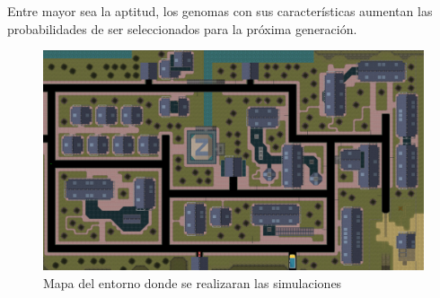 \documentclass[conference]{IEEEtran}
\begin{document}
Entre mayor sea la aptitud, los genomas con sus características aumentan las probabilidades de ser seleccionados para la próxima generación.

\begin{figure}[H]
    \centering
    \includegraphics[scale=0.14]{images/gta2.png}
    \caption{Mapa del entorno donde se realizaran las simulaciones}
    \label{fig:Mapa}
\end{figure} 
\end{document}
